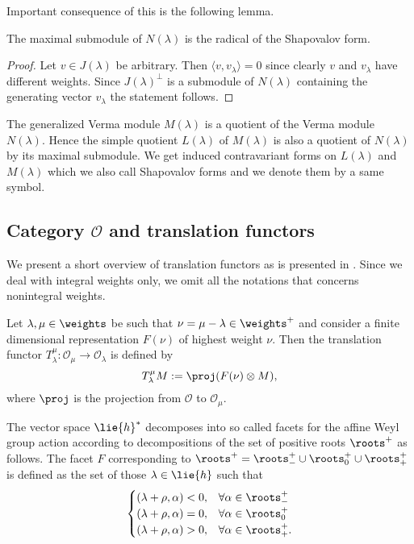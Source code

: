 Important consequence of this is the following lemma.
\begin{lemma}
The maximal submodule of $N(\lambda)$ is the radical of the Shapovalov form.
\end{lemma}
\begin{proof}
Let $v\in J(\lambda)$  be arbitrary. Then $\langle v, v_\lambda \rangle = 0$ since clearly $v$ and $v_\lambda$ have different weights. Since $J(\lambda)^\perp$ is a submodule of $N(\lambda)$ containing the generating vector $v_\lambda$ the statement follows.
\end{proof}

The generalized Verma module $M(\lambda)$ is a quotient of the Verma module $N(\lambda)$. Hence the simple quotient $L(\lambda)$ of $M(\lambda)$ is also a quotient of $N(\lambda)$ by its maximal submodule. We get induced contravariant forms on $L(\lambda)$ and $M(\lambda)$  which we also call Shapovalov forms and we denote them by a same symbol.

\subsection[Category O and translation functors]{Category $\mathcal{O}$ and translation functors}

We present a short overview of translation functors as is presented in \cite{humphreys_representations_2008}. Since we deal with integral weights only, we omit all the notations that concerns nonintegral weights.

\begin{definition}
  Let $\lambda, \mu \in \weights$ be such that $\nu = \mu - \lambda \in \weights^+$ and consider a finite dimensional representation $F(\nu)$ of highest weight $\nu$. Then the translation functor $T_\lambda^\mu: \mathcal{O}_\mu \to \mathcal{O}_\lambda$ is defined by
  \[
   T_\lambda^\mu M := \proj(F(\nu)\otimes M),
  \]
  where $\proj$ is the projection from $\mathcal{O}$ to $\mathcal{O}_\mu$.
\end{definition}

The vector space $\lie{h}^*$ decomposes into so called facets for the affine Weyl group action according to decompositions of the set of positive roots $\roots^+$ as follows. The facet $F$ corresponding to $\roots^+ = \roots^+_- \cup \roots^+_0 \cup \roots^+_+$ is defined as the set of those $\lambda \in \lie{h}$ such that
\[
  \begin{cases}
   (\lambda + \rho, \alpha) < 0, & \forall \alpha \in \roots^+_- \\
   (\lambda + \rho, \alpha) = 0, & \forall \alpha \in \roots^+_0 \\
   (\lambda + \rho, \alpha) > 0, & \forall \alpha \in \roots^+_+.
  \end{cases}
\]

